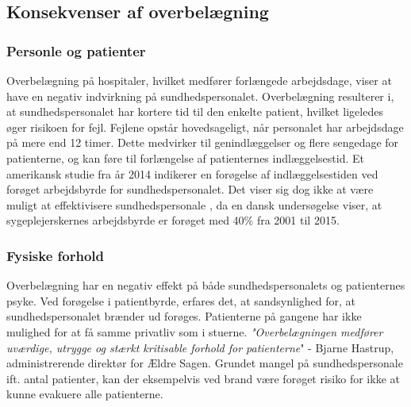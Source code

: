 \subsection{Konsekvenser af overbelægning}


\subsubsection{Personle og patienter}
Overbelægning på hospitaler, hvilket medfører forlængede arbejdsdage, viser at have en negativ indvirkning på sundhedspersonalet. \citep{Kjeldsen2015} \citep{Dinges2004} Overbelægning resulterer i, at sundhedspersonalet har kortere tid til den enkelte patient, hvilket ligeledes øger risikoen for fejl. Fejlene opstår hovedsageligt, når personalet har arbejdsdage på mere end 12 timer. \citep{Dinges2004} Dette medvirker til genindlæggelser og flere sengedage for patienterne, og kan føre til forlængelse af patienternes indlæggelsestid. Et amerikansk studie fra år 2014 indikerer en forøgelse af indlæggelsestiden ved forøget arbejdsbyrde for sundhedspersonalet\citep{Elliott2014}. Det viser sig dog ikke at være muligt at effektivisere sundhedspersonale , da en dansk undersøgelse viser, at sygeplejerskernes arbejdsbyrde er forøget med 40\% fra 2001 til 2015.\citep{Kjeldsen2015}  

\subsubsection{Fysiske forhold}

Overbelægning har en negativ effekt på både sundhedspersonalets og patienternes psyke. Ved forøgelse i patientbyrde, erfares det, at sandsynlighed for, at sundhedspersonalet brænder ud forøges. \citep{Aiken2002} 
Patienterne på gangene har ikke mulighed for at få samme privatliv som i stuerne. \citep{Madsen2014} \textit{"Overbelægningen medfører uværdige, utrygge og stærkt kritisable forhold for patienterne}" - Bjarne Hastrup, administrerende direktør for Ældre Sagen. \citep{Politiken2013}
Grundet mangel på sundhedspersonale ift. antal patienter, kan der eksempelvis ved brand være forøget risiko for ikke at kunne evakuere alle patienterne. \citep{Madsen2014} 

